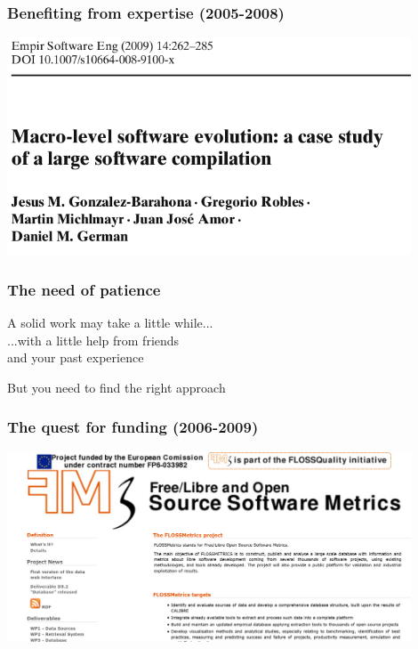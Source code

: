 \documentclass[17pt,aspectratio=169,hyperref=pdfusetitle]{beamer}
\begin{document}
\begin{frame}[fragile]
  \frametitle{Benefiting from expertise (2005-2008)}

  \begin{center}
  \includegraphics[width=12cm]{figs/macro-evolution}
  \end{center}  
  
\end{frame}

\begin{frame}[fragile]
  \frametitle{The need of patience}

  A solid work may take a little while... \\
  ...with a little help from friends \\
  and your past experience \\
  
  \begin{center}
    But you need to find the right approach
  \end{center}  
  
\end{frame}


\begin{frame}[fragile]
  \frametitle{The quest for funding (2006-2009)}

  \begin{center}
  \includegraphics[width=12cm]{figs/flossmetrics}
  \end{center}  
  
\end{frame}
\end{document}
